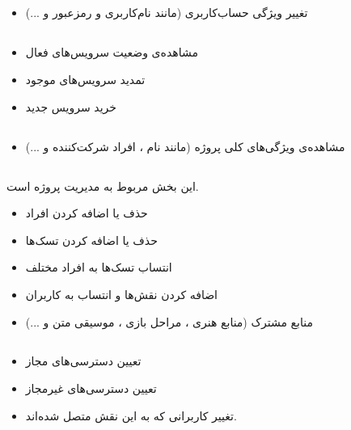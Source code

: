 \documentclass[10pt,a4paper]{article}
\begin{document}
	\subsection{
	}
\begin{itemize}
	\item 
تغییر ویژگی حساب‌کاربری (مانند نام‌کاربری و رمزعبور و ...)
\end{itemize}
	\subsection{
	}

\begin{itemize}
	\item 
مشاهده‌ی وضعیت سرویس‌های فعال 
	\item
تمدید سرویس‌های موجود
	\item
خرید سرویس جدید
\end{itemize}

	\subsection{
	}

\begin{itemize}
	\item 
مشاهده‌ی ویژگی‌های کلی پروژه (مانند نام ، افراد شرکت‌کننده و ...)
\end{itemize}

	\subsection{
}
این بخش مربوط به مدیریت پروژه است.
\begin{itemize}
	\item 
	حذف یا اضافه کردن افراد
	\item
حذف یا اضافه کردن تسک‌ها
	\item
	انتساب تسک‌ها به افراد مختلف
	\item
	اضافه کردن نقش‌ها و انتساب به کاربران

	\item
	منابع مشترک (منابع هنری ، مراحل بازی ، موسیقی متن و ...)
\end{itemize}


\subsection{
}
\begin{itemize}
	\item
تعیین دسترسی‌های مجاز
\item
تعیین دسترسی‌های غیرمجاز
\item
تغییر کاربرانی که به این نقش متصل شده‌اند.
\end{itemize}
\end{document}
